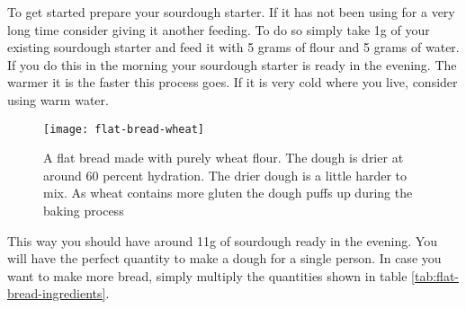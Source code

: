 \begin{table}[htb!]
  \centering
  \caption{\label{tab:flat-bread-ingredients}Flat breads or pancakes recipe for 1 person. Multiply the ingredients
  to increase portion size. Refer to the section \ref{section:bakers-math} "" to learn how
  to understand and use the percentages properly.} 
\end{table}

To get started prepare your sourdough starter. If it has not been using for a very
long time consider giving it another feeding. To do so simply take 1g of your
existing sourdough starter and feed it with 5 grams of flour and 5 grams of water.
If you do this in the morning your sourdough starter is ready in the evening. The
warmer it is the faster this process goes. If it is very cold where you live, consider
using warm water.

\begin{figure}[htb!]
  \texttt{[image: flat-bread-wheat]}
  \centering
  \caption{A flat bread made with purely wheat flour. The dough is drier
  at around 60 percent hydration.  The drier dough is a little harder
  to mix. As wheat contains more gluten the dough puffs up during
  the baking process}
\end{figure}

This way you should have around 11g of sourdough ready in the evening. You will have
the perfect quantity to make a dough for a single person. In case you want to make more
bread, simply multiply the quantities shown in table \ref*{tab:flat-bread-ingredients}.


